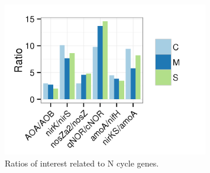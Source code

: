 \documentclass[12pt]{article}
\begin{document}
    \begin{figure}[tbph!]
    \centering
    \includegraphics[width=0.8\textwidth]{figures/xander-ncycle-ratio}
    \caption[Ratios of interest related to N cycle genes]{Ratios of interest related to N cycle genes.}
    \label{fig:xander-ncycle-ratio}
    \end{figure}
\end{document}
